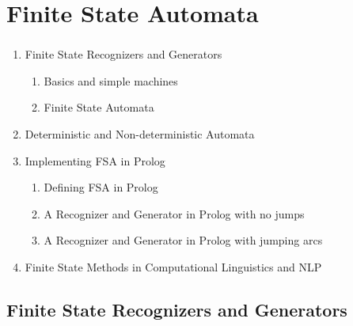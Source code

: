 \frame[plain]{\titlepage}


\section{Finite State Automata}

\begin{frame}

	\begin{center}
		\Huge \insertsection
	\end{center}

\end{frame}


\begin{frame}

	\frametitle{\insertsection}
	
	\begin{enumerate}
		\item Finite State Recognizers and Generators
		\begin{enumerate}
			\item Basics and simple machines
			\item Finite State Automata
		\end{enumerate}
		\item Deterministic and Non-deterministic Automata
		\item Implementing FSA in Prolog
		\begin{enumerate}
			\item Defining FSA in Prolog
			\item A Recognizer and Generator in Prolog with no jumps
			\item A Recognizer and Generator in Prolog with jumping arcs
		\end{enumerate}
		\item Finite State Methods in Computational Linguistics and NLP
	\end{enumerate}

\end{frame}

\subsection{Finite State Recognizers and Generators}

